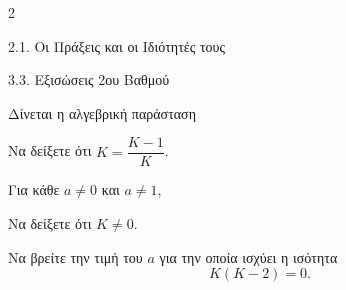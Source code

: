 \begin{ylh}{2}
    \item 2.1. Οι Πράξεις και οι Ιδιότητές τους
    \item 3.3. Εξισώσεις 2ου Βαθμού
\end{ylh}
Δίνεται η αλγεβρική παράσταση 
\begin{alist}
\item Να δείξετε ότι $K=\dfrac{K-1}{K}$.
\item Για κάθε $a\neq 0$ και $a\neq 1$,
\begin{rlist}
 \item Να δείξετε ότι $K\neq 0$.
\item Να βρείτε την τιμή του $a$ για την οποία ισχύει η ισότητα \[K(K-2) = 0.\]
\end{rlist}
\end{alist}

